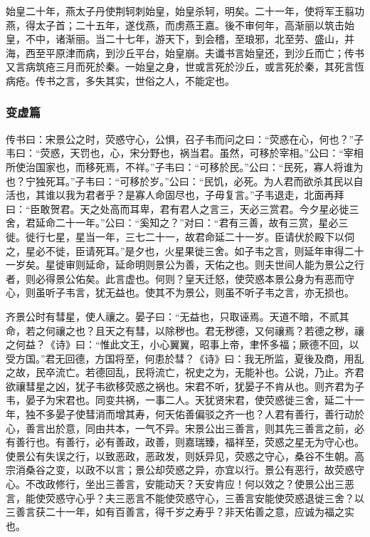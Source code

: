 \documentclass[]{article}
\begin{document}
始皇二十年，燕太子丹使荆轲刺始皇，始皇杀轲，明矣。二十一年，使将军王翦功燕，得太子首；二十五年，遂伐燕，而虏燕王嘉。後不审何年，高渐丽以筑击始皇，不中，诸渐丽。当二十七年，游天下，到会稽，至琅邪，北至劳、盛山，并海，西至平原津而病，到沙丘平台，始皇崩。夫谶书言始皇还，到沙丘而亡；传书又言病筑疮三月而死於秦。一始皇之身，世或言死於沙丘，或言死於秦，其死言恆病疮。传书之言，多失其实，世俗之人，不能定也。

\hypertarget{header-n168}{%
\subsubsection{变虚篇}\label{header-n168}}

传书曰：宋景公之时，荧惑守心，公惧，召子韦而问之曰：``荧惑在心，何也？''子韦曰：``荧惑，天罚也，心，宋分野也，祸当君。虽然，可移於宰相。''公曰：``宰相所使治国家也，而移死焉，不祥。''子韦曰：``可移於民。''公曰：``民死，寡人将谁为也？宁独死耳。''子韦曰：``可移於岁。''公曰：``民饥，必死。为人君而欲杀其民以自活也，其谁以我为君者乎？是寡人命固尽也，子毋复言。''子韦退走，北面再拜曰：``臣敢贺君。天之处高而耳卑，君有君人之言三，天必三赏君。今夕星必徙三舍，君延命二十一年。''公曰：``奚知之？''对曰：``君有三善，故有三赏，星必三徙。徙行七星，星当一年，三七二十一，故君命延二十一岁。臣请伏於殿下以伺之，星必不徙，臣请死耳。''是夕也，火星果徙三舍。如子韦之言，则延年审得二十一岁矣。星徙审则延命，延命明则景公为善，天佑之也。则夫世间人能为景公之行者，则必得景公佑矣。此言虚也。何则？皇天迁怒，使荧惑本景公身为有恶而守心，则虽听子韦言，犹无益也。使其不为景公，则虽不听子韦之言，亦无损也。

齐景公时有彗星，使人禳之。晏子曰：``无益也，只取诬焉。天道不暗，不贰其命，若之何禳之也？且天之有彗，以除秽也。君无秽德，又何禳焉？若德之秽，禳之何益？《诗》曰：``惟此文王，小心翼翼，昭事上帝，聿怀多福；厥德不回，以受方国。''君无回德，方国将至，何患於彗？《诗》曰：我无所监，夏後及商，用乱之故，民卒流亡。若德回乱，民将流亡，祝史之为，无能补也。公说，乃止。齐君欲禳彗星之凶，犹子韦欲移荧惑之祸也。宋君不听，犹晏子不肯从也。则齐君为子韦，晏子为宋君也。同变共祸，一事二人。天犹贤宋君，使荧惑徙三舍，延二十一年，独不多晏子使彗消而增其寿，何天佑善偏驳之齐一也？人君有善行，善行动於心，善言出於意，同由共本，一气不异。宋景公出三善言，则其先三善言之前，必有善行也。有善行，必有善政，政善，则嘉瑞臻，福祥至，荧惑之星无为守心也。使景公有失误之行，以致恶政，恶政发，则妖异见，荧惑之守心，桑谷不生朝。高宗消桑谷之变，以政不以言；景公却荧惑之异，亦宜以行。景公有恶行，故荧惑守心。不改政修行，坐出三善言，安能动天？天安肯应！何以效之？使景公出三恶言，能使荧惑守心乎？夫三恶言不能使荧惑守心，三善言安能使荧惑退徙三舍？以三善言获二十一年，如有百善言，得千岁之寿乎？非天佑善之意，应诚为福之实也。
\end{document}
